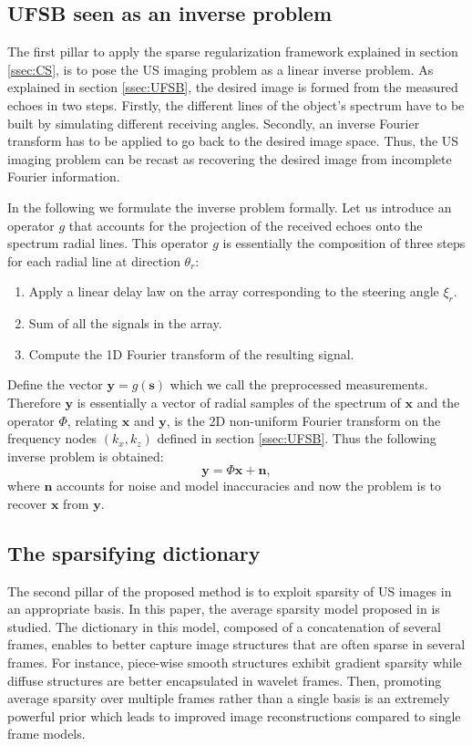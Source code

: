 \documentclass[conference]{IEEEtran}
\begin{document}
\subsection{UFSB seen as an inverse problem}
The first pillar to apply the sparse regularization framework explained in section \ref{ssec:CS}, is to pose the US imaging problem as a linear inverse problem. As explained in section \ref{ssec:UFSB}, the desired image is formed from the measured echoes in two steps. Firstly, the different lines of the object's spectrum have to be built by simulating different receiving angles. Secondly, an inverse Fourier transform has to be applied to go back to the desired image space. Thus, the US imaging problem can be recast as recovering the desired image from incomplete Fourier information.

In the following we formulate the inverse problem formally. Let us introduce an operator $g$ that accounts for the projection of the received echoes onto the spectrum radial lines. This operator $g$ is essentially the composition of three steps for each radial line at direction $\theta_r$: 
\begin{enumerate}
\item Apply a linear delay law on the array corresponding to the steering angle $\xi_r$. 
\item Sum of all the signals in the array.
\item Compute the 1D Fourier transform of the resulting signal.
\end{enumerate}
Define the vector $\bm{y} = g \left( \bm{s} \right)$ which we call the preprocessed measurements. Therefore $\bm{y}$ is essentially a vector of radial samples of the spectrum of $\bm{x}$ and the operator $\mathsf{\Phi}$, relating $\bm{x}$ and $\bm{y}$, is the 2D non-uniform Fourier transform on the frequency nodes $\left( k_x, k_z \right)$ defined in section \ref{ssec:UFSB}. Thus the following inverse problem is obtained:
\begin{equation}
\bm{y} = \mathsf{\Phi} \bm{x} + \bm{n},
\end{equation}
where $\bm{n}$ accounts for noise and model inaccuracies and now the problem is to recover $\bm{x}$ from $\bm{y}$.

\subsection{The sparsifying dictionary}
The second pillar of the proposed method is to exploit sparsity of US images in an appropriate basis. In this paper, the average sparsity model proposed in \cite{Carrillo_SPL_2013} is studied. The dictionary in this model, composed of a concatenation of several frames, enables to better capture image structures that are often sparse in several frames. For instance, piece-wise smooth structures exhibit gradient sparsity while diffuse structures are better encapsulated in wavelet frames. Then, promoting average sparsity over multiple frames rather than a single basis is an extremely powerful prior which leads to improved image reconstructions compared to single frame models.
\end{document}
